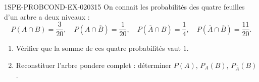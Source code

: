 \begin{exercice}{1SPE-PROBCOND-EX-020}{3}{15}
On connait les probabilités des quatre feuilles d'un arbre a deux niveaux :
\[
  P(A \cap B) = \frac{3}{20}, \quad P(A \cap \overline{B}) = \frac{1}{20}, \quad P(\overline{A} \cap B) = \frac{1}{4}, \quad P(\overline{A} \cap \overline{B}) = \frac{11}{20}.
\]

\begin{enumerate}
  \item Vérifier que la somme de ces quatre probabilités vaut $1$.
  \item Reconstituer l'arbre pondere complet : déterminer $P(A)$, $P_A(B)$, $P_{\overline{A}}(B)$.
\end{enumerate}
\end{exercice}
